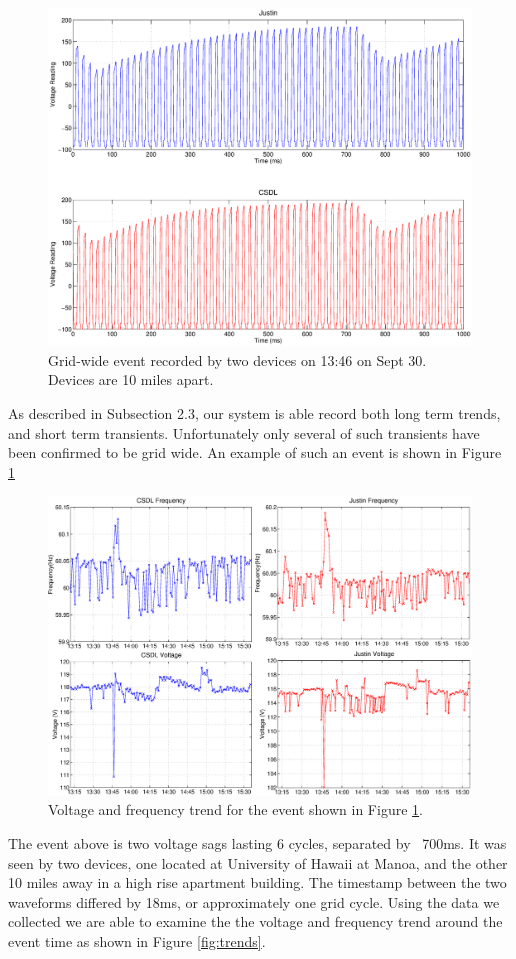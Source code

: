 \begin{figure}[h!]
\centering
\includegraphics[width=\textwidth]{img/gridwide.eps}
\caption{Grid-wide event recorded by two devices on 13:46 on Sept 30. Devices are 10 miles apart.}
\label{fig:grid}
\end{figure} 

As described in Subsection 2.3, our system is able record both long term trends, and short term transients. Unfortunately only several of such transients have been confirmed to be grid wide. An example of such an event is shown in Figure \ref{fig:grid}

\begin{figure}[h!]
\centering
\includegraphics[width=1\textwidth]{img/gridwide_trends.eps}
\caption{Voltage and frequency trend for the event shown in Figure \ref{fig:grid}.}
\label{fig:daytrends}
\end{figure} 
The event above is two voltage sags lasting 6 cycles, separated by ~700ms. It was seen by two devices, one located at University of Hawaii at Manoa, and the other 10 miles away in a high rise apartment building. The timestamp between the two waveforms differed by 18ms, or approximately one grid cycle. Using the data we collected we are able to examine the the voltage and frequency trend around the event time as shown in Figure \ref{fig:trends}.

